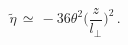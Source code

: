 \begin{equation}
{\tilde{\eta}} \, \simeq \, 
- 36 \theta^{2}\biggr(\frac{z}{l_{\bot}}\biggr )^{2} \, .
\end{equation}

